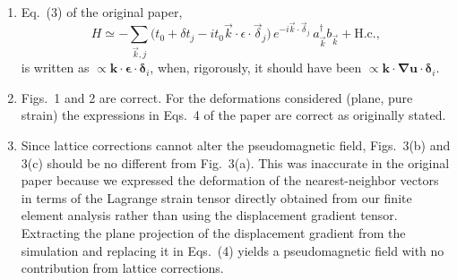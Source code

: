 \begin{enumerate}
  \item Eq.~(3) of the original paper,
\begin{equation*}
  H \simeq -\sum_{\vec{k},j} \bigl(
  t_0 + \delta t_j - it_0\vec{k}\cdot\epsilon\cdot\vec{\delta}_j
  \bigr) \, e^{-i\vec{k}\cdot\vec{\delta}_j} \,
  a_{\vec{k}}^{\dagger}b_{\vec{k}} + \text{H.c.}
  ,
  \label{eq:H-TB-strain}
\end{equation*}
is written as $\propto \bm{k}\cdot\bm{\epsilon}\cdot\bm{\delta}_i$, when, rigorously, it should have been $\propto\bm{k}\cdot\bm{\nabla u}\cdot\bm{\delta}_i$.
  \item Figs.~1 and 2 are correct.  For the deformations considered (plane, pure strain) the expressions in Eqs.~4 of the paper are correct as originally stated.
  \item Since lattice corrections cannot alter the pseudomagnetic field, Figs.~3(b) and 3(c) should be no different from Fig.~3(a).  This was inaccurate in the original paper because we expressed the deformation of the nearest-neighbor vectors in terms of the Lagrange strain tensor directly obtained from our finite element analysis rather than using the displacement gradient tensor. Extracting the plane projection of the displacement gradient from the simulation and replacing it in Eqs.~(4) yields a pseudomagnetic field with no contribution from lattice corrections. 
\end{enumerate}